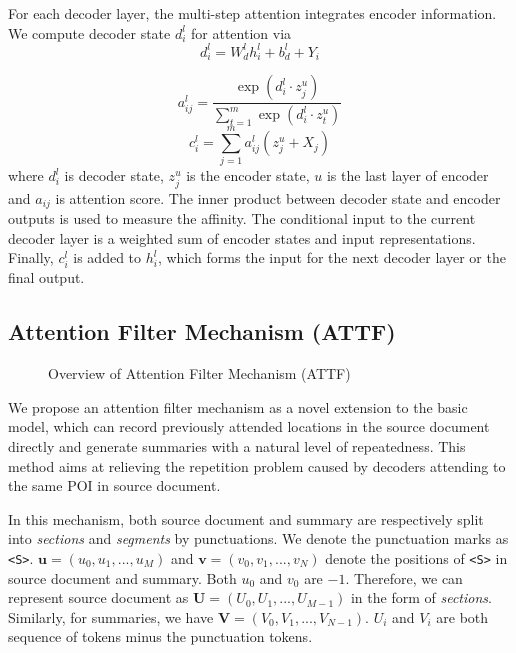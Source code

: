 \documentclass{nle}
\theoremstyle{definition}
\begin{document}
For each decoder layer, the multi-step attention integrates encoder information. 
We compute decoder state $d_{i}^{l}$ for attention via
\begin{equation}
	d _ { i } ^ { l } = W _ { d } ^ { l } h _ { i } ^ { l } + b _ { d } ^ { l } + Y _ { i }
\end{equation}

\begin{equation}\label{eq:a}
	a _ { i j } ^ { l } = \frac { \exp \left( d _ { i } ^ { l } \cdot z _ { j } ^ { u } \right) } { \sum _ { t = 1 } ^ { m } \exp \left( d _ { i } ^ { l } \cdot z _ { t } ^ { u } \right) }
\end{equation}
\begin{equation}\label{eq:c}
	c _ { i } ^ { l } = \sum _ { j = 1 } ^ { m } a _ { i j } ^ { l } \left( z _ { j } ^ { u } + X_j \right)
\end{equation}
where $d_{i}^{l}$ is decoder state, $z_{j}^{u}$ is the encoder state, 
$u$ is the last layer of encoder
and $a_{ij}$ is attention score.
The inner product between decoder state and encoder outputs is used 
to measure the affinity. 
The conditional input to the current 
decoder layer is a weighted sum of encoder states and input representations.
Finally, $c _ { i } ^ { l }$ is added to $h_{i}^{l}$, which forms the input for the next decoder layer or the final output.

\subsection{Attention Filter Mechanism (ATTF)}
\label{sec:attf}

\begin{figure}[th]
	\centering
	\caption{Overview of Attention Filter Mechanism (ATTF)}
	\label{fig:model_main}
\end{figure}


\label{sec:attnf}
We propose an attention filter mechanism as a novel extension 
to the basic model,
which can record previously attended locations 
in the source document directly and generate summaries 
with a natural level of repeatedness. 
This method aims at relieving the repetition problem caused by 
decoders attending to the same POI in source document.

In this mechanism, both source document and summary are 
respectively split into 
\textit{sections} and \textit{segments} by punctuations. We
denote the punctuation marks as \verb#<S>#.
$\mathbf{u}=(u_{0},u_{1},...,u_{M})$ 
and $\mathbf{v}=(v_{0},v_{1},...,v_{N})$
denote the positions of \verb#<S># in source document and summary.
Both $u_{0}$ and $v_{0}$ are $-1$.
Therefore, we can represent source document as $\mathbf{U}=(U_{0},U_{1},...,U_{M-1})$ in the form of \textit{sections}. Similarly, for summaries, we have $\mathbf{V}=(V_{0},V_{1},...,V_{N-1})$. 
$U_i$ and $V_i$ are
both sequence of tokens minus the punctuation tokens.
\end{document}
